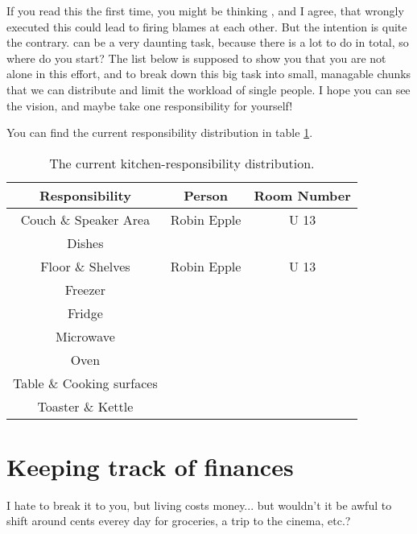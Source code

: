 If you read this the first time, you might be thinking , and I agree, that wrongly executed this could lead to firing blames at each other. But the intention is quite the contrary.  can be a very daunting task, because there is a lot to do in total, so where do you start? The list below is supposed to show you that you are not alone in this effort, and to break down this big task into small, managable chunks that we can distribute and limit the workload of single people. I hope you can see the vision, and maybe take one responsibility for yourself!

You can find the current responsibility distribution in table \ref{tab:kitchen-responsibilities}.

\begin{table}[htp]
    \centering
    \begin{tabular}{ccc}
        \rowcolor[HTML]{F89646} 
        Responsibility            & Person      & Room Number \\ \hline
        Couch \& Speaker Area     & Robin Epple & U 13        \\ \hline
        Dishes                    &             &             \\ \hline
        Floor \& Shelves          & Robin Epple & U 13        \\ \hline
        Freezer                   &             &             \\ \hline
        Fridge                    &             &             \\ \hline
        Microwave                 &             &             \\ \hline
        Oven                      &             &             \\ \hline
        Table \& Cooking surfaces &             &             \\ \hline
        Toaster \& Kettle         &             &             \\ \hline
    \end{tabular}
    \caption{The current kitchen-responsibility distribution.}
    \label{tab:kitchen-responsibilities}
\end{table}

\section{Keeping track of finances}
I hate to break it to you, but living costs money... but wouldn't it be awful to shift around cents everey day for groceries, a trip to the cinema, etc.?

